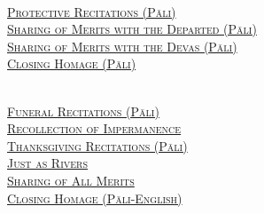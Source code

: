 {  \clearpage

  {\libertinusFont\selectfont\textbf{\textsc{\fontsize{18}{12}\selectfont{}}}}\\

  \textsc{\fontsize{14.4}{28}\selectfont
    \hyperref[deva-aradhana]{Protective Recitations (Pāli)} \ifdesktopversion\else\pageref{deva-aradhana}\fi\\
    \hyperref[sharing-merits-departed]{Sharing of Merits with the Departed (Pāli)} \ifdesktopversion\else\pageref{sharing-merits-departed}\fi\\
    \hyperref[sharing-merits-devas]{Sharing of Merits with the Devas (Pāli)} \ifdesktopversion\else\pageref{sharing-merits-devas}\fi\\
    \hyperref[closing-homage]{Closing Homage (Pāli)} \ifdesktopversion\else\pageref{closing-homage}\fi\\
  }

  \vspace{1.0cm}

  {\libertinusFont\selectfont\textbf{\textsc{\fontsize{18}{12}\selectfont{}}}}\\

  \textsc{\fontsize{14.4}{28}\selectfont
    \hyperref[pubba-bhaga-nama-kara-patho-funeral]{Funeral Recitations (Pāli)} \ifdesktopversion\else\pageref{pubba-bhaga-nama-kara-patho-funeral}\fi\\
    \hyperref[recollection-of-impermanence]{Recollection of Impermanence} \ifdesktopversion\else\pageref{recollection-of-impermanence}\fi\\
    \hyperref[yatha-vari-vaha-pura]{Thanksgiving Recitations (Pāli)} \ifdesktopversion\else\pageref{yatha-vari-vaha-pura}\fi\\
    \hyperref[just-as-rivers]{Just as Rivers} \ifdesktopversion\else\pageref{just-as-rivers}\fi\\
    \hyperref[sharing-all-merits]{Sharing of All Merits} \ifdesktopversion\else\pageref{sharing-all-merits}\fi\\
    \hyperref[closing-homage]{Closing Homage (Pāli-English)} \ifdesktopversion\else\pageref{closing-homage}\fi\\
  }}
